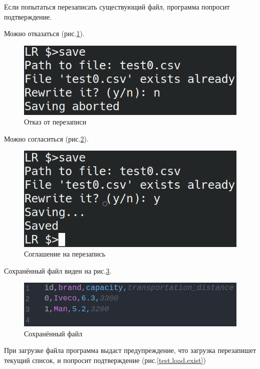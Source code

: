 Если попытаться перезаписать существующий файл, программа попросит подтверждение.

Можно отказаться (рис.\ref{test.save.n}).

\begin{figure}[H]
    \centering
    \includegraphics[width=0.9\linewidth]{photo/test.save.n}
    \caption{Отказ от перезаписи}
    \label{test.save.n}
\end{figure}

Можно согласиться (рис.\ref{test.save.y}).

\begin{figure}[H]
    \centering
    \includegraphics[width=0.9\linewidth]{photo/test.save.y}
    \caption{Соглашение на перезапись}
    \label{test.save.y}
\end{figure}

Сохранённый файл виден на рис.\ref{test.file}.

\begin{figure}[H]
    \centering
    \includegraphics[width=0.9\linewidth]{photo/test.file}
    \caption{Сохранённый файл}
    \label{test.file}
\end{figure}

При загрузке файла программа выдаст предупреждение, что 
загрузка перезапишет текущий список, и попросит подтверждение (рис.\ref{test.load.exist})

